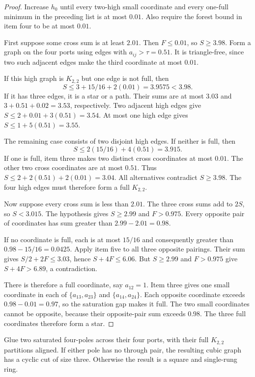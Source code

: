 \begin{proof}
Increase $h_0$ until every two-high small coordinate and every one-full minimum in the preceding list is at most $0.01$.
Also require the forest bound in item four to be at most $0.01$.

First suppose some cross sum is at least $2.01$.
Then $F\le0.01$, so $S\ge3.98$.
Form a graph on the four ports using edges with $a_{ij}>\tau=0.51$.
It is triangle-free, since two such adjacent edges make the third coordinate at most $0.01$.

If this high graph is $K_{2,2}$ but one edge is not full, then
\[
 S\le3+15/16+2(0.01)=3.9575<3.98.
\]
If it has three edges, it is a star or a path.
Their sums are at most $3.03$ and $3+0.51+0.02=3.53$, respectively.
Two adjacent high edges give $S\le2+0.01+3(0.51)=3.54$.
At most one high edge gives $S\le1+5(0.51)=3.55$.

The remaining case consists of two disjoint high edges.
If neither is full, then
\[
 S\le2(15/16)+4(0.51)=3.915.
\]
If one is full, item three makes two distinct cross coordinates at most $0.01$.
The other two cross coordinates are at most $0.51$.
Thus $S\le2+2(0.51)+2(0.01)=3.04$.
All alternatives contradict $S\ge3.98$.
The four high edges must therefore form a full $K_{2,2}$.

Now suppose every cross sum is less than $2.01$.
The three cross sums add to $2S$, so $S<3.015$.
The hypothesis gives $S\ge2.99$ and $F>0.975$.
Every opposite pair of coordinates has sum greater than $2.99-2.01=0.98$.

If no coordinate is full, each is at most $15/16$ and consequently greater than $0.98-15/16=0.0425$.
Apply item five to all three opposite pairings.
Their sum gives $S/2+2F\le3.03$, hence $S+4F\le6.06$.
But $S\ge2.99$ and $F>0.975$ give $S+4F>6.89$, a contradiction.

There is therefore a full coordinate, say $a_{12}=1$.
Item three gives one small coordinate in each of $\{a_{13},a_{23}\}$ and $\{a_{14},a_{24}\}$.
Each opposite coordinate exceeds $0.98-0.01=0.97$, so the saturation gap makes it full.
The two small coordinates cannot be opposite, because their opposite-pair sum exceeds $0.98$.
The three full coordinates therefore form a star.
\end{proof}

\begin{lemma}
\label{lem:four-coefficient-aligned-rings}
Glue two saturated four-poles across their four ports, with their full $K_{2,2}$ partitions aligned.
If either pole has no through pair, the resulting cubic graph has a cyclic cut of size three.
Otherwise the result is a square and single-rung ring.
\end{lemma}

